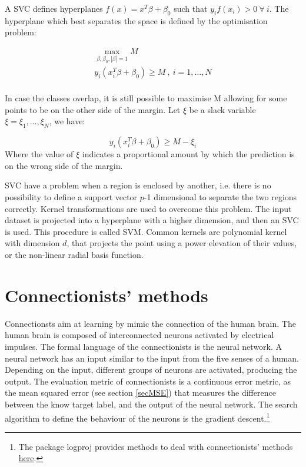 A SVC defines hyperplanes $f\left(x\right)=x^T\beta+\beta_0$ such that $y_if\left(x_i\right)>0\ \forall\ i$. The hyperplane which best separates the space is defined by the optimisation problem:

\begin{equation}
\begin{split}
        \max_{\beta,\beta_0,\left|\beta\right|=1}{M}\\
        y_i\left(x_i^T\beta+\beta_0\right)\geq M\ ,\ i=1,\ldots,N\\
\end{split}
\label{eq_svm1}
\end{equation}

In case the classes overlap, it is still possible to maximise M allowing for some points to be on the other side of the margin. Let $\xi$ be a slack variable $\xi={\xi_1,\ldots,\xi_N}$, we have:

\begin{equation}
        y_i\left(x_i^T\beta+\beta_0\right)\geq M-\xi_i
\label{eq_svm2}
\end{equation}
Where the value of $\xi$ indicates a proportional amount by which the prediction is on the wrong side of the margin.\par

SVC have a problem when a region is enclosed by another, i.e. there is no possibility to define a support vector $p$-1 dimensional to separate the two regions correctly. Kernel transformations are used to overcome this problem. The input dataset is projected into a hyperplane with a higher dimension, and then an SVC is used. This procedure is called SVM. Common kernels are polynomial kernel with dimension $d$, that projects the point using a power elevation of their values, or the non-linear radial basis function. 

\section{Connectionists’ methods}
Connectionsts aim at learning by mimic the connection of the human brain. The human brain is composed of interconnected neurons activated by electrical impulses. The formal language of the connectionists is the neural network. A neural network has an input similar to the input from the five senses of a human. Depending on the input, different groups of neurons are activated, producing the output. The evaluation metric of connectionists is a continuous error metric, as the mean squared error (see section \ref{secMSE}) that measures the difference between the know target label, and the output of the neural network. The search algorithm to define the behaviour of the neurons is the gradient descent.\footnote{The package logproj provides methods to deal with connectionists' methods \href{https://github.com/aletuf93/logproj/blob/master/logproj/M_learningMethod/connectionists_models.py}{here}.}

